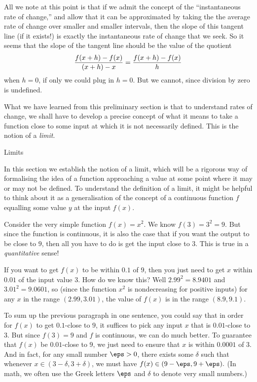 All we note at this point is that if we admit the concept of the ``instantaneous rate of change,'' and
allow that it can be approximated by taking the the average rate of change over smaller and smaller
intervals, then the slope of this tangent line (if it exists!) is exactly the instantaneous rate of change
that we seek. So it seems that the slope of the tangent line should be the value of the quotient
$$ {f(x+h) - f(x) \over (x+h) - x} = {f(x+h) - f(x) \over h}$$
when $h=0$, if only we could plug in $h=0$. But we cannot, since division by zero is undefined.

What we have learned from this preliminary section is that to understand rates of change,
we shall have to develop a precise concept of what it means to take a function
close to some input at which it is not necessarily defined. This is the notion of a {\it limit}.

\advsect Limits

In this section we establish the notion of a limit, which will be a rigorous way of formalising
the idea of a function approaching a value at some point where it may or may not be defined.
To understand the definition of a limit, it might be helpful to think about it as a generalisation of the concept
of a continuous function $f$ equalling some value $y$ at the input $f(x)$.

Consider the very simple function $f(x) = x^2$. We know $f(3) = 3^2 = 9$. But since the function is continuous,
it is also the case that if you want the output to be close to $9$, then all you have to do is get the input
close to $3$. This is true in a {\it quantitative} sense!

If you want to get $f(x)$ to be within $0.1$ of $9$, then you just need to get $x$ within $0.01$ of the
input value $3$. How do we know this? Well $2.99^2 = 8.9401$ and $3.01^2 = 9.0601$, so (since the function
$x^2$ is nondecreasing for positive inputs) for any $x$
in the range $(2.99, 3.01)$, the value of $f(x)$ is in the range $(8.9, 9.1)$.

To sum up the previous paragraph in one sentence, you could say that in order for $f(x)$ to get
$0.1$-close to $9$, it suffices to pick any input $x$ that is $0.01$-close to $3$.
But since $f(3) = 9$ and $f$ is continuous, we can do much better. To guarantee that $f(x)$ be
$0.01$-close to $9$, we just need to ensure that $x$ is within $0.0001$ of $3$.
And in fact, for any small number $\eps>0$, there exists some $\delta$ such that whenever
$x\in (3-\delta, 3+\delta)$, we must have $f(x) \in (9-\eps, 9+\eps).$
(In math, we often use the Greek letters $\eps$ and $\delta$ to denote very small numbers.)

